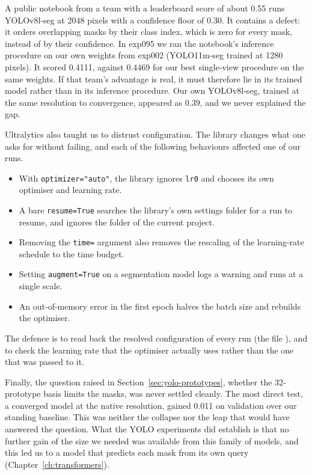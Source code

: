 A public notebook from a team with a leaderboard score of about 0.55 runs YOLOv8l-seg at 2048 pixels
with a confidence floor of 0.30. It contains a defect: it orders overlapping masks by their class
index, which is zero for every mask, instead of by their confidence. In exp095 we ran the notebook's
inference procedure on our own weights from exp002 (YOLO11m-seg trained at 1280 pixels). It scored
0.4111, against 0.4469 for our best single-view procedure on the same weights. If that team's
advantage is real, it must therefore lie in its trained model rather than in its inference
procedure. Our own
YOLOv8l-seg, trained at the same resolution to convergence, appeared as 0.39, and we never explained
the gap.

Ultralytics also taught us to distrust configuration. The library changes what one asks for without
failing, and each of the following behaviours affected one of our runs.
\begin{itemize}[leftmargin=*,itemsep=1pt]
\item With \texttt{optimizer="auto"}, the library ignores \texttt{lr0} and chooses its own optimiser
and learning rate.
\item A bare \texttt{resume=True} searches the library's own settings folder for a run to resume,
and ignores the folder of the current project.
\item Removing the \texttt{time=} argument also removes the rescaling of the learning-rate schedule
to the time budget.
\item Setting \texttt{augment=True} on a segmentation model logs a warning and runs at a single
scale.
\item An out-of-memory error in the first epoch halves the batch size and rebuilds the optimiser.
\end{itemize}
The defence is to read back the resolved configuration of every run (the file ),
and to check the learning rate that the optimiser actually uses rather than the one that was
passed to it.

Finally, the question raised in Section~\ref{sec:yolo-prototypes}, whether the 32-prototype basis
limits the masks, was never settled cleanly. The most direct test, a converged model at the native
resolution, gained 0.011 on validation over our standing baseline. This was neither the collapse nor
the leap that would have answered the question. What the YOLO experiments did establish is that no
further gain of the size we needed was available from this family of models, and this led us to a
model that predicts each mask from its own query (Chapter~\ref{ch:transformers}).

